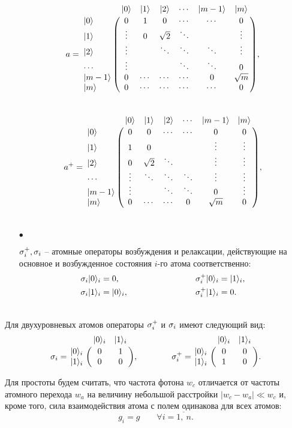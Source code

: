 \begin{itemize}
{		\begin{equation}
			a =
			\bordermatrix{
				& |0\ra & |1\ra & |2\ra & \cdots & |m-1\ra & |m\ra \cr
				|0\ra & 0 & 1 & 0 & \cdots & \cdots & 0 \cr
				|1\ra & \vdots & 0 & \sqrt{2} & \ddots &  & \vdots \cr
				|2\ra & \vdots &  & \ddots & \ddots & \ddots & \vdots \cr
				\cdots & \vdots &  &  & \ddots & \ddots & 0 \cr
				|m-1\ra & 0 & \cdots & \cdots & \cdots & 0 & \sqrt{m} \cr
				|m\ra & 0 & \cdots & \cdots & \cdots & \cdots & 0\cr
			},
		\end{equation}
	}\\[12pt]
	\begin{equation}
		a^{+} =
		\bordermatrix{
			& |0\ra & |1\ra & |2\ra & \cdots & |m-1\ra & |m\ra \cr
			|0\ra & 0 & 0 & \cdots & \cdots & 0 & 0 \cr
			|1\ra & 1 & 0 &  &  & \vdots & \vdots \cr
			|2\ra & 0 & \sqrt{2} & \ddots & & \vdots & \vdots \cr
			\cdots & \vdots & \ddots & \ddots & \ddots & \vdots & \vdots \cr
			|m-1\ra & \vdots &  & \ddots & \ddots & 0 & \vdots \cr
			|m\ra & 0 & \cdots & \cdots & 0 & \sqrt{m} & 0\cr
		},
	\end{equation}
	\\
	\item[$\bullet$]{$\sigma^{+}_{i}, \sigma_{i}$ -- атомные операторы возбуждения и релаксации, действующие на основное и возбужденное состояния $i$-го атома соответственно:\\
		\begin{equation}
			\begin{split}
				\sigma_{i}|0\rangle_{i} = 0,\hspace{9em}\sigma^{+}_{i}|0\rangle_{i} = |1\rangle_{i},\\
				\sigma_{i}|1\rangle_{i} = |0\rangle_{i},\hspace{8em}\sigma^{+}_{i}|1\rangle_{i} = 0.\hspace{1em}
			\end{split}
		\end{equation}
		
	}
\end{itemize}
\
\\[12pt]
Для двухуровневых атомов операторы $\sigma^{+}_{i}$ и $\sigma_{i}$ имеют следующий вид:
\begin{equation}
	\s_{i} = \bordermatrix{
		& |0\ra_{i} & |1\ra_{i} \cr 
		|0\ra_{i} & 0 & 1 \cr 
		|1\ra_{i} & 0 & 0 \cr
	},
	\qquad\qquad
	\s_{i}^{+} = \bordermatrix{ 
		& |0\ra_{i} & |1\ra_{i} \cr
		|0\ra_{i} & 0 & 0 \cr
		|1\ra_{i} & 1 & 0 \cr 
	}.
\end{equation}

Для простоты будем считать, что частота фотона $w_{c}$ отличается от частоты атомного
перехода $w_{a}$ на величину небольшой расстройки $|w_{c} - w_{a}| \ll w_{c}$ и, кроме того, сила взаимодействия атома с полем одинакова для всех атомов:
\[
g_{i} = g\qquad\forall i = \overline{1,~n}.
\]

